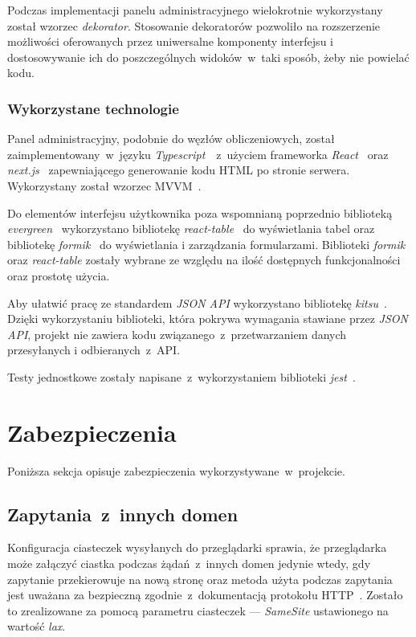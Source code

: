\documentclass[a4paper,11pt,twoside]{report}
\theoremstyle{definition}
\begin{document}
Podczas implementacji panelu administracyjnego wielokrotnie wykorzystany został wzorzec \textit{dekorator}. Stosowanie dekoratorów pozwoliło na rozszerzenie możliwości oferowanych przez uniwersalne komponenty interfejsu i dostosowywanie ich do poszczególnych widoków~w~taki sposób, żeby nie powielać kodu.


\subsubsection{Wykorzystane technologie}
Panel administracyjny, podobnie do węzłów obliczeniowych, został zaimplementowany~w~języku \textit{Typescript}~\cite{typescript}~z~użyciem frameworka \textit{React}~\cite{react} oraz \textit{next.js}~\cite{next.js} zapewniającego generowanie kodu HTML po stronie serwera. Wykorzystany został wzorzec MVVM~\cite{mvvm}.

Do elementów interfejsu użytkownika poza wspomnianą poprzednio biblioteką \textit{evergreen}~\cite{evergreen} wykorzystano bibliotekę \textit{react-table}~\cite{react-table} do wyświetlania tabel oraz bibliotekę \textit{formik}~\cite{formik} do wyświetlania i zarządzania formularzami. Biblioteki \textit{formik} oraz \textit{react-table} zostały wybrane ze względu na ilość dostępnych funkcjonalności oraz prostotę użycia.

Aby ułatwić pracę ze standardem \textit{JSON API} wykorzystano bibliotekę \textit{kitsu}~\cite{kitsu}.
Dzięki wykorzystaniu biblioteki, która pokrywa wymagania stawiane przez \textit{JSON API}, projekt nie zawiera kodu związanego~z~przetwarzaniem danych przesyłanych i odbieranych~z~API.

Testy jednostkowe zostały napisane~z~wykorzystaniem biblioteki \textit{jest}~\cite{jest}.


\section{Zabezpieczenia}
\label{zabezpieczenia}

Poniższa sekcja opisuje zabezpieczenia wykorzystywane~w~projekcie.

\subsection{Zapytania~z~innych domen}

Konfiguracja ciasteczek wysyłanych do przeglądarki sprawia, że przeglądarka może załączyć ciastka podczas żądań~z~innych domen jedynie wtedy, gdy zapytanie przekierowuje na nową stronę oraz metoda użyta podczas zapytania jest uważana za bezpieczną zgodnie~z~dokumentacją protokołu HTTP~\cite{rfc-7231}.
Zostało to zrealizowane za pomocą parametru ciasteczek --- \textit{SameSite} ustawionego na wartość \textit{lax}.
\end{document}
